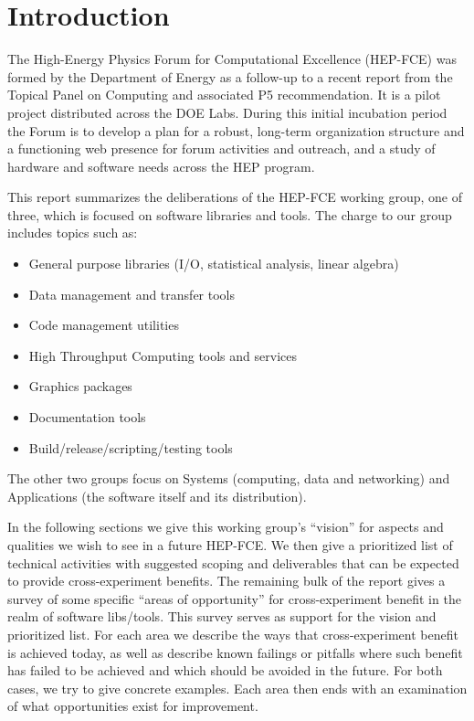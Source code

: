 \section{Introduction}

The High-Energy Physics Forum for Computational Excellence (HEP-FCE)
was formed by the Department of Energy as a follow-up to a recent
report from the Topical Panel on Computing and associated P5
recommendation.
%
It is a  pilot project distributed across the DOE Labs.  
%
During this initial incubation period the Forum is to develop a plan
for a robust, long-term organization structure and a functioning web
presence for forum activities and outreach, and a study of hardware
and software needs across the HEP program.

This report summarizes the deliberations of the HEP-FCE working group,
one of three, which is focused on software libraries and tools.  The
charge to our group includes topics such as:

\begin{itemize}
\item General purpose libraries (I/O, statistical analysis, linear algebra)
\item  Data management and transfer tools
\item  Code management utilities
\item  High Throughput Computing tools and services
\item  Graphics packages
\item  Documentation tools
\item  Build/release/scripting/testing tools
\end{itemize}

The other two groups focus on Systems (computing, data and networking)
and Applications (the software itself and its distribution).   

In the following sections we give this working group's ``vision'' for
aspects and qualities we wish to see in a future HEP-FCE.  We then
give a prioritized list of technical activities with suggested scoping
and deliverables that can be expected to provide cross-experiment
benefits.  The remaining bulk of the report gives a survey of some
specific ``areas of opportunity'' for cross-experiment benefit in the
realm of software libs/tools.  This survey serves as support for the
vision and prioritized list.  For each area we describe the ways that
cross-experiment benefit is achieved today, as well as describe known
failings or pitfalls where such benefit has failed to be achieved and
which should be avoided in the future.  For both cases, we try to give
concrete examples.  Each area then ends with an examination of what
opportunities exist for improvement.


